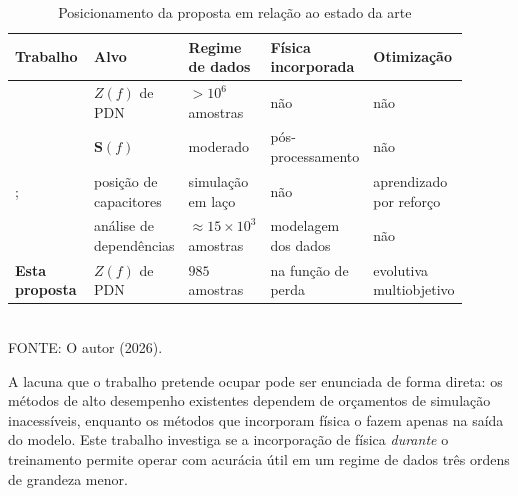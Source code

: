 \begin{table}[htb]
\centering
\caption{Posicionamento da proposta em relação ao estado da arte}
\label{quad:posicionamento}
\footnotesize
\begin{tabular}{@{}p{0.20\linewidth}p{0.16\linewidth}p{0.17\linewidth}p{0.17\linewidth}p{0.20\linewidth}@{}}
\toprule
\textbf{Trabalho} & \textbf{Alvo} & \textbf{Regime de dados} & \textbf{Física
incorporada} & \textbf{Otimização} \\
\midrule
\citet{zhang2021} & $Z(f)$ de PDN & $>10^6$ amostras & não & não \\[0.3em]
\citet{torun2020} & $\mathbf{S}(f)$ & moderado & pós-processamento &
não \\[0.3em]
\citet{zhang2020decap}; \citet{duan2024} & posição de capacitores & simulação
em laço & não & aprendizado por reforço \\[0.3em]
\citet{hillebrecht2024} & análise de dependências & $\approx 15\times 10^3$
amostras & modelagem dos dados & não \\[0.3em]
\textbf{Esta proposta} & $Z(f)$ de PDN & $985$ amostras & na função de perda &
evolutiva multiobjetivo \\
\bottomrule
\end{tabular}
\vspace{0.3em}
\\{\footnotesize FONTE: O autor (2026).}
\end{table}

A lacuna que o trabalho pretende ocupar pode ser enunciada de forma direta: os
métodos de alto desempenho existentes dependem de orçamentos de simulação
inacessíveis, enquanto os métodos que incorporam física o fazem apenas na saída
do modelo. Este trabalho investiga se a incorporação de física \emph{durante} o
treinamento permite operar com acurácia útil em um regime de dados três ordens de
grandeza menor.
